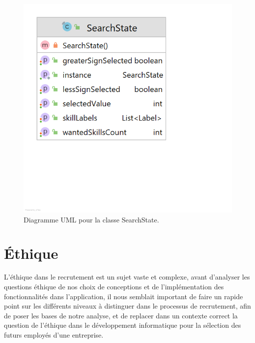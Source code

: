 \documentclass{article}
\begin{document}
\begin{figure}[!tbp]
\centering
\begin{minipage}[b]{0.5\textwidth}
    \includegraphics[width=\textwidth]{SearchState.png}
    \caption{\label{fig:SearchState}Diagramme UML pour la classe SearchState.}
\end{minipage}
\end{figure}
\newpage
\section{Éthique}
L'éthique dans le recrutement est un sujet vaste et complexe, avant d'analyser les questions éthique de nos choix de conceptions et de l'implémentation des fonctionnalités dans l'application, il nous semblait important de faire un rapide point sur les différents niveaux à distinguer dans le processus de recrutement, afin de poser les bases de notre analyse, et de replacer dans un contexte correct la question de l'éthique dans le développement informatique pour la sélection des futurs employés d'une entreprise.
\end{document}
